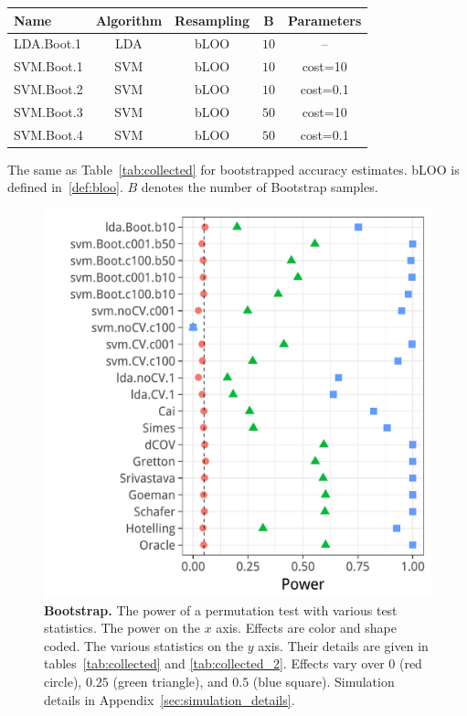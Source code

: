 \documentclass[journal]{IEEEtran}
\begin{document}
\bigskip

\begin{tcolorbox}
	\centering
	\tiny
	\begin{tabular}{l|c|c|c|c}
		Name & Algorithm & Resampling & B  & Parameters\\ 
		\hline
		\hline
		LDA.Boot.1 & LDA & bLOO 	& $10$ &  -- \\ 
		SVM.Boot.1 & SVM & bLOO 	& $10$ & cost=10 \\ 
		SVM.Boot.2 & SVM & bLOO 	& $10$ & cost=0.1 \\ 
		SVM.Boot.3 & SVM & bLOO 	& $50$ & cost=10 \\ 
		SVM.Boot.4 & SVM & bLOO 	& $50$ & cost=0.1 \\ 
	\end{tabular} 
	\captionsetup{type=table}
	\caption{\footnotesize
		The same as Table~\ref{tab:collected} for bootstrapped accuracy estimates. 
		bLOO is defined in~\ref{def:bloo}.
		$B$ denotes the number of Bootstrap samples.} 
	\label{tab:collected_2}
\end{tcolorbox}


\begin{figure}[ht]
	\centering
	\includegraphics[width=0.7\columnwidth]{"art/file13"}
	\caption{
		\textbf{Bootstrap.}
		The power of a permutation test with various test statistics. 
		The power on the $x$ axis. 
		Effects are color and shape coded. 
		The various statistics on the $y$ axis. 
		Their details are given in tables~\ref{tab:collected} and \ref{tab:collected_2}. 
		Effects vary over $0$ (red circle), $0.25$ (green triangle), and $0.5$ (blue square). 
		Simulation details in Appendix~\ref{sec:simulation_details}.
	} 
	\label{fig:bootstrap}
\end{figure}
\end{document}
